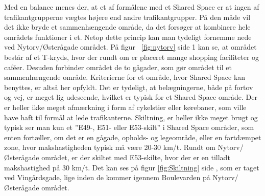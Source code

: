 Med en balance menes der, at et af formålene med et Shared Space er at ingen af trafikantgrupperne vægtes højere end andre trafikantgrupper. På den måde vil det ikke bryde et sammenhængende område, da det forsøger at kombinere hele områdets funktioner i et. Netop dette princip kan man tydeligt fornemme nede ved Nytorv/Østerågade området.  På figur ~\cref{fig:nytorv} side \pageref*{fig:nytorv} 1 kan se, at området består af et T-kryds, hvor der rundt om er placeret mange shopping faciliteter og caféer. Desuden forbinder området de to gågader, som gør området til et sammenhængende område. Kriterierne for et område, hvor Shared Space kan benyttes, er altså her opfyldt.
Det er tydeligt, at belægningerne, både på fortov og vej, er meget lig udeseende, hvilket er typisk for et Shared Space område. Der er heller ikke meget afmærkning i form af cykelstier eller kørebaner, som ville have haft til formål at lede trafikanterne. Skiltning, er heller ikke meget brugt og typisk ser man kun et ”E49-, E51- eller E53-skilt” i Shared Space områder, som enten fortæller, om det er en gågade, opholds- og legeområde, eller en fartdæmpet zone, hvor makshastigheden typisk må være 20-30 km/t.  Rundt om Nytorv/Østerågade området, er der skiltet med E53-skilte, hvor der er en tilladt makshastighed på 30 km/t. Det kan ses på figur \cref{fig:Skiltning} side \pageref{fig:Skiltning}, som er taget ved Vingårdsgade, lige inden de kommer igennem Boulevarden på Nytorv/Østerågade området.

